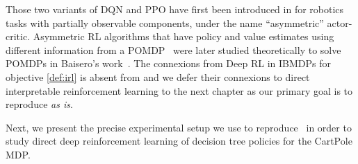 Those two variants of DQN and PPO have first been introduced in \cite{pinto} for robotics tasks with partially observable components, under the name ``asymmetric'' actor-critic. 
Asymmetric RL algorithms that have policy and value estimates using different information from a POMDP~\cite{POMDP,chap2} were later studied theoretically to solve POMDPs in Baisero's work~\cite{baisero-dqn,baisero-ppo}.
The connexions from Deep RL in IBMDPs for objective \ref{def:irl} is absent from \cite{topin2021iterative} and we defer their connexions to direct interpretable reinforcement learning to the next chapter as our primary goal is to reproduce \cite{topin2021iterative} \textit{as is}.

Next, we present the precise experimental setup we use to reproduce~\cite[Table 1]{topin2021iterative} in order to study direct deep reinforcement learning of decision tree policies for the CartPole MDP.

